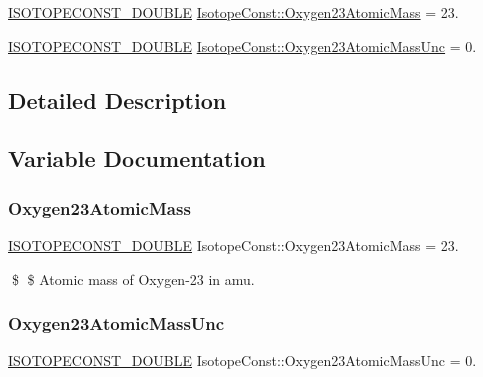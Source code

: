 \begin{DoxyCompactItemize}
\item 
\mbox{\hyperlink{group___isotope_const-_macros_ga8f45a7272ce02c0b4c65c44636ed719a}{I\+S\+O\+T\+O\+P\+E\+C\+O\+N\+S\+T\+\_\+\+D\+O\+U\+B\+LE}} \mbox{\hyperlink{group___isotope_const-_oxygen-_o23_gaa8637245087e433d5daf81390815e5fa}{Isotope\+Const\+::\+Oxygen23\+Atomic\+Mass}} = 23.
\item 
\mbox{\hyperlink{group___isotope_const-_macros_ga8f45a7272ce02c0b4c65c44636ed719a}{I\+S\+O\+T\+O\+P\+E\+C\+O\+N\+S\+T\+\_\+\+D\+O\+U\+B\+LE}} \mbox{\hyperlink{group___isotope_const-_oxygen-_o23_gade29859daab0f7a1e3776cc1f79b1b4b}{Isotope\+Const\+::\+Oxygen23\+Atomic\+Mass\+Unc}} = 0.
\end{DoxyCompactItemize}


\subsection{Detailed Description}


\subsection{Variable Documentation}
\mbox{\label{group___isotope_const-_oxygen-_o23_gaa8637245087e433d5daf81390815e5fa}} 
\subsubsection{\texorpdfstring{Oxygen23\+Atomic\+Mass}{Oxygen23AtomicMass}}
{\footnotesize\ttfamily \mbox{\hyperlink{group___isotope_const-_macros_ga8f45a7272ce02c0b4c65c44636ed719a}{I\+S\+O\+T\+O\+P\+E\+C\+O\+N\+S\+T\+\_\+\+D\+O\+U\+B\+LE}} Isotope\+Const\+::\+Oxygen23\+Atomic\+Mass = 23.}

\$ \$ Atomic mass of Oxygen-\/23 in amu. \mbox{\label{group___isotope_const-_oxygen-_o23_gade29859daab0f7a1e3776cc1f79b1b4b}} 
\subsubsection{\texorpdfstring{Oxygen23\+Atomic\+Mass\+Unc}{Oxygen23AtomicMassUnc}}
{\footnotesize\ttfamily \mbox{\hyperlink{group___isotope_const-_macros_ga8f45a7272ce02c0b4c65c44636ed719a}{I\+S\+O\+T\+O\+P\+E\+C\+O\+N\+S\+T\+\_\+\+D\+O\+U\+B\+LE}} Isotope\+Const\+::\+Oxygen23\+Atomic\+Mass\+Unc = 0.}

